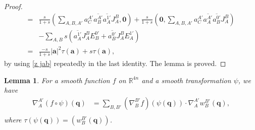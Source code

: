 \documentclass[a4paper,11pt]{amsart}
\numberwithin{equation}{section}
\newtheorem{lem}{Lemma}[section]
\begin{document}
\begin{proof}
\begin{equation}
\begin{aligned}
=&\frac{s}{1+s}\left(\sum_{A,B,A'}a_C^{A'}\overline{a_B^{A'}}\overline{a_A^{1'}}J_A^B,\mathbf{0}\right)+\frac{s}{1+s}\left(\mathbf{0},\sum_{A,B,A'}a_C^{A'}\overline{a_A^{A'}}\overline{a_B^{0'}}J_A^B\right)\\
&-\sum_{A,B}s\left(\overline{a_A^{1'}}J_A^BE_B^{0'}+\overline{a_B^{0'}}J_A^BE_A^{1'}\right)\\
=&\frac{-s}{1+s}|\mathbf{a}|^2\tau(\mathbf{a})+s\tau(\mathbf{a}),
\end{aligned}\end{equation}
by using \eqref{z jab} repeatedly in the last identity. The lemma is proved.
\end{proof}

\begin{lem}\label{chain rule}
For a smooth function $f$ on $\mathbb{R}^{4n}$ and a smooth transformation $\psi$, we have
\begin{equation}\begin{aligned}
\nabla_{A}^{A'}(f\circ \psi)(\mathbf{q})&=\sum_{B,B'}\left(\nabla_{B}^{B'}f\right)\left(\psi(\mathbf{q})\right)\cdot\nabla_{A}^{A'}w_{B}^{B'}(\mathbf{q}),\\
\end{aligned}\end{equation}
where $\tau(\psi(\mathbf{q}))=(w_{B}^{B'}(\mathbf{q}))$.
\end{lem}
\end{document}
